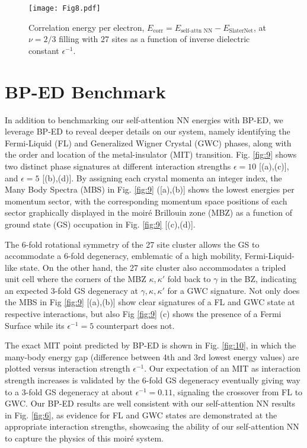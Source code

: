 \documentclass[
 reprint,
 amsmath,amssymb,
 aps, prx,
floatfix,longbibliography,
]{revtex4-2}
\newcommand{\FNN}{self-attention NN }
\begin{document}
\begin{appendix}
\begin{figure}
    \centering
    \texttt{[image: Fig8.pdf]}
    \caption{Correlation energy per electron, $E_\text{corr} = E_\text{self-attn NN}-E_\text{SlaterNet}$, at $\nu=2/3$ filling with $27$ sites as a function of inverse dielectric constant $\epsilon^{-1}$.  
    }
    \label{fig:8}
\end{figure}

\section{BP-ED Benchmark}
\label{app:ED-benchmark}

In addition to benchmarking our \FNN energies with BP-ED, we leverage BP-ED to reveal deeper details on our system, namely identifying the Fermi-Liquid (FL) and Generalized Wigner Crystal (GWC) phases, along with the order and location of the metal-insulator (MIT) transition. Fig. \ref{fig:9} shows two distinct phase signatures at different interaction strengths $\epsilon=10$ [(a),(c)], and $\epsilon=5$ [(b),(d)]. By assigning each crystal momenta an integer index, the Many Body Spectra (MBS) in Fig. \ref{fig:9} ([a),(b)] shows the lowest energies per momentum sector, with the corresponding momentum space positions of each sector graphically displayed in the moiré Brillouin zone (MBZ) as a function of ground state (GS) occupation in Fig. \ref{fig:9} [(c),(d)]. 

The 6-fold rotational symmetry of the 27 site cluster allows the GS to accommodate a 6-fold degeneracy, emblematic of a high mobility, Fermi-Liquid-like state. On the other hand, the 27 site cluster also accommodates a tripled unit cell where the corners of the MBZ $\kappa, \kappa'$ fold back to $\gamma$ in the BZ, indicating an expected 3-fold GS degeneracy at $\gamma, \kappa, \kappa'$ for a GWC signature. Not only does the MBS in Fig \ref{fig:9} [(a),(b)] show clear signatures of a FL and GWC state at respective interactions, but also Fig \ref{fig:9} (c) shows the presence of a Fermi Surface while its $\epsilon^{-1}=5$ counterpart does not. 

The exact MIT point predicted by BP-ED is shown in Fig. \ref{fig:10}, in which the many-body energy gap (difference between 4th and 3rd lowest energy values) are plotted versus interaction strength $\epsilon^{-1}$. Our expectation of an MIT as interaction strength increases is validated by the 6-fold GS degeneracy eventually giving way to a 3-fold GS degeneracy at about $\epsilon^{-1}=0.11$, signaling the crossover from FL to GWC. Our BP-ED results are well consistent with our \FNN results in Fig. \ref{fig:6}, as evidence for FL and GWC states are demonstrated at the appropriate interaction strengths, showcasing the ability of our \FNN to capture the physics of this moiré system.    


\end{appendix}
\end{document}
